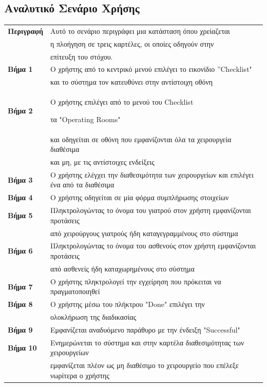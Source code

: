 \documentclass{article}
\newcommand\T{\rule{0pt}{2.6ex}}       %
\newcommand\B{\rule[-1.2ex]{0pt}{0pt}}
\begin{document}
 \subsection{Αναλυτικό Σενάριο Χρήσης}
 
 \begin{center}
     \begin{tabular}{|l|l|}
     \hline
      \textbf{Περιγραφή} & Αυτό το σενάριο περιγράφει μια κατάσταση όπου χρείαζεται \T \\& η πλοήγηση σε τρεις καρτέλες, οι οποίες οδηγούν στην \\& επίτευξη του στόχου. \B \\ 
      \hline
      \textbf{Βήμα 1} & Ο χρήστης από το κεντρικό μενού επιλέγει το εικονίδιο  ”Checklist" \T \\& και το σύστημα τον κατευθύνει στην αντίστοιχη οθόνη \B \\
      \hline
      \textbf{Βήμα 2} & Ο χρήστης επιλέγει από το μενού του Checklist \T  τα "Operating Rooms" \T \\& και οδηγείται σε οθόνη που εμφανίζονται όλα τα χειρουργεία διαθέσιμα\\& και μη, με τις αντίστοιχες ενδείξεις \B \\
      \hline
      \textbf{Βήμα 3} & Ο χρήστης ελέγχει την διαθεσιμότητα των χειρουργείων και επιλέγει ένα από τα διαθέσιμα \T\B \\
      \hline
      \textbf{Βήμα 4} & Ο χρήστης οδηγείται σε μία φόρμα συμπλήρωσης στοιχείων \T\B \\
      \hline
      \textbf{Βήμα 5} & Πληκτρολογώντας το όνομα του γιατρού στον χρήστη εμφανίζονται προτάσεις \T \\& από χειρούργους γιατρούς ήδη καταγεγραμμένους στο σύστημα \B \\
      \hline
      \textbf{Βήμα 6} & Πληκτρολογώντας το όνομα του ασθενούς στον χρήστη εμφανίζονται προτάσεις \T \\& από ασθενείς ήδη καταχωρημένους στο σύστημα \B \\
      \hline      
      \textbf{Βήμα 7} & Ο χρήστης πληκτρολογεί την εγχείρηση που πρόκειται να πραγματοποιηθεί \T\B \\   
      \hline
      \textbf{Βήμα 8} & Ο χρήστης μέσω του πλήκτρου "Done" επιλέγει την \T \\& ολοκλήρωση της διαδικασίας \B \\
      \hline
      \textbf{Βήμα 9} & Εμφανίζεται αναδυόμενο παράθυρο με την ένδειξη "Successful" \T\B \\
      \hline
      \textbf{Βήμα 10} & Ενημερώνεται το σύστημα και στην καρτέλα διαθεσιμότητας των χειρουργείων \T \\& εμφανίζεται πλέον ως μη διαθέσιμο το χειρουργείο που επέλεξε νωρίτερα ο χρήστης \B \\
      \hline
     \end{tabular}
 \end{center}
 
\end{document}
